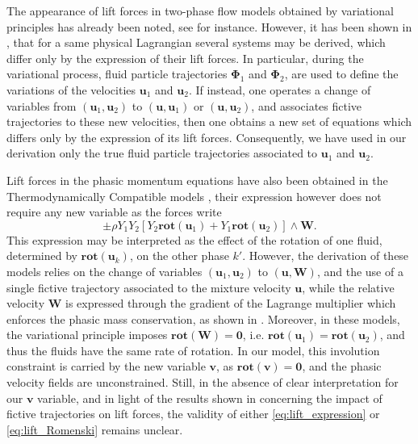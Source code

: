 \documentclass{myclass}
\newcommand{\Traj}{\bm{\Phi}}
\newcommand{\vel}{\bm{u}}
\newcommand{\pth}[1]  {\left( #1 \right)}
\newcommand{\brck}[1]  {\left[ #1 \right]}
\newcommand{\rot}{\mathbf{rot}}
\begin{document}
The appearance of lift forces in two-phase flow models obtained by variational principles has already been noted, see \cite{romenski:2007} for instance. However, it has been shown in \cite{gavrilyuk:2020}, that for a same physical Lagrangian several systems may be derived, which differ only by the expression of their lift forces. In particular, during the variational process, fluid particle trajectories $\Traj_1$ and $\Traj_2$, are used to define the variations of the velocities $\vel_1$ and $\vel_2$. If instead, one operates a change of variables from $(\vel_1, \vel_2)$ to $(\vel, \vel_1)$ or $(\vel, \vel_2)$, and associates fictive trajectories to these new velocities, then one obtains a new set of equations which differs only by the expression of its lift forces. Consequently, we have used in our derivation only the true fluid particle trajectories associated to $\vel_1$ and $\vel_2$. 

Lift forces in the phasic momentum equations have also been obtained in the Thermodynamically Compatible models \cite{romenski:2004,romenski:2007,romenski:2010}, their expression however does not require any new variable as the forces write
\begin{equation}
\pm\rho Y_1 Y_2 \brck{Y_2\rot\pth{\vel_1} + Y_1\rot\pth{\vel_2}}\wedge\bm{W}. \label{eq:lift_Romenski}
\end{equation}
This expression may be interpreted as the effect of the rotation of one fluid, determined by $\rot(\vel_k)$, on the other phase $k'$. However, the  derivation of these models relies on the change of variables $(\vel_1, \vel_2)$ to $(\vel, \bm{W})$, and the use of a single fictive trajectory associated to the mixture velocity $\vel$, while the relative velocity $\bm{W}$ is expressed through the gradient of the Lagrange multiplier which enforces the phasic mass conservation, as shown in \cite{haegeman_RelVel:2025}. Moreover, in these models, the variational principle imposes $\rot(\bm{W})=\bm{0}$, i.e. $\rot(\vel_1)=\rot(\vel_2)$, and thus the fluids have the same rate of rotation. In our model, this involution constraint is carried by the new variable $\bm{v}$, as $\rot(\bm{v})=\bm{0}$, and the phasic velocity fields are unconstrained. Still, in the absence of clear interpretation for our $\bm{v}$ variable, and in light of the results shown in \cite{gavrilyuk:2020} concerning the impact of fictive trajectories on lift forces, the validity of either \eqref{eq:lift_expression} or \eqref{eq:lift_Romenski} remains unclear.
\end{document}
